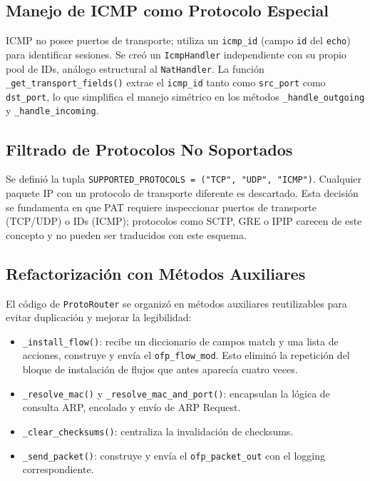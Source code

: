 \documentclass[11pt, a4paper]{article}
\begin{document}
\subsection{Manejo de ICMP como Protocolo Especial}
\label{subsec:icmp}

ICMP no posee puertos de transporte; utiliza un \texttt{icmp\_id} (campo \texttt{id} del \texttt{echo}) para identificar sesiones. Se creó un \texttt{IcmpHandler} independiente con su propio pool de IDs, análogo estructural al \texttt{NatHandler}. La función \texttt{\_get\_transport\_fields()} extrae el \texttt{icmp\_id} tanto como \texttt{src\_port} como \texttt{dst\_port}, lo que simplifica el manejo simétrico en los métodos \texttt{\_handle\_outgoing} y \texttt{\_handle\_incoming}.

\subsection{Filtrado de Protocolos No Soportados}
\label{subsec:filtrado}

Se definió la tupla \texttt{SUPPORTED\_PROTOCOLS = ("TCP", "UDP", "ICMP")}. Cualquier paquete IP con un protocolo de transporte diferente es descartado. Esta decisión se fundamenta en que PAT requiere inspeccionar puertos de transporte (TCP/UDP) o IDs (ICMP); protocolos como SCTP, GRE o IPIP carecen de este concepto y no pueden ser traducidos con este esquema.

\subsection{Refactorización con Métodos Auxiliares}
\label{subsec:refactor}

El código de \texttt{ProtoRouter} se organizó en métodos auxiliares reutilizables para evitar duplicación y mejorar la legibilidad:

\begin{itemize}
    \item \texttt{\_install\_flow()}: recibe un diccionario de campos match y una lista de acciones, construye y envía el \texttt{ofp\_flow\_mod}. Esto eliminó la repetición del bloque de instalación de flujos que antes aparecía cuatro veces.
    \item \texttt{\_resolve\_mac()} y \texttt{\_resolve\_mac\_and\_port()}: encapsulan la lógica de consulta ARP, encolado y envío de ARP Request.
    \item \texttt{\_clear\_checksums()}: centraliza la invalidación de checksums.
    \item \texttt{\_send\_packet()}: construye y envía el \texttt{ofp\_packet\_out} con el logging correspondiente.
\end{itemize}
\end{document}
